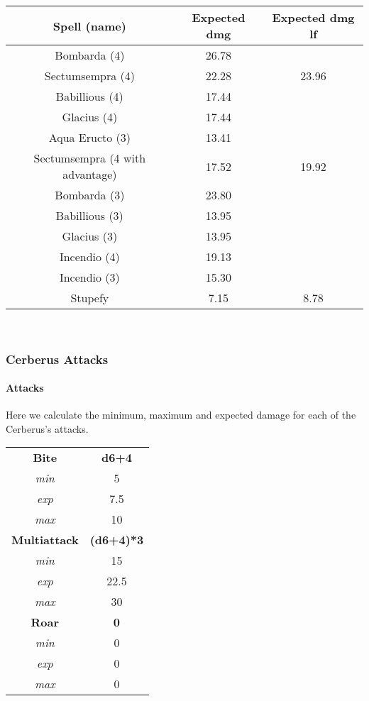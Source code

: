 \begin{tabular}{|c|c|c|}
	\textbf{Spell (name)} & \textbf{Expected dmg} & \textbf{Expected dmg lf} \\ \hline
	Bombarda (4)                    & 26.78 &       \\
	Sectumsempra (4)                & 22.28 & 23.96 \\
	Babillious (4)                  & 17.44 &       \\
	Glacius (4)                     & 17.44 &       \\
	Aqua Eructo (3)                 & 13.41 &       \\
	Sectumsempra (4 with advantage) & 17.52 & 19.92 \\
	Bombarda (3)                    & 23.80 &       \\
	Babillious (3)                  & 13.95 &       \\
	Glacius (3)                     & 13.95 &       \\
	Incendio (4)                    & 19.13 &       \\
	Incendio (3)                    & 15.30 &       \\
	Stupefy                         &  7.15 &  8.78 \\ \hline
\end{tabular}\\


\subsubsection{Cerberus Attacks}

\paragraph{Attacks} Here we calculate the minimum, maximum and expected damage for each of the Cerberus's attacks.\\

\begin{tabular}{|c|c|}
	\textbf{Bite}        & \textbf{d6+4}     \\
	\textit{min}         &          5        \\
	\textit{exp}         &          7.5      \\
	\textit{max}         &         10        \\ \hline
	\textbf{Multiattack} & \textbf{(d6+4)*3} \\
	\textit{min}         &         15        \\
	\textit{exp}         &         22.5      \\
	\textit{max}         &         30        \\ \hline
	\textbf{Roar}        &  \textbf{0}       \\
	\textit{min}         &          0        \\
	\textit{exp}         &          0        \\
	\textit{max}         &          0        \\ \hline
\end{tabular}\\

